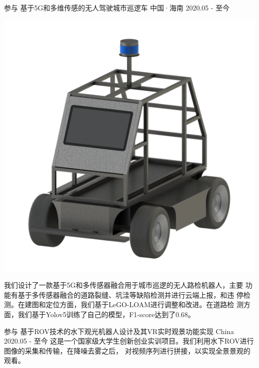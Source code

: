 \begin{cventries}
\cventry
{参与} %
{基于5G和多维传感的无人驾驶城市巡逻车} %
{中国·海南} %
{2020.05 - 至今} %
{
	\begin{minipage}[b]{0.25\linewidth}
		\includegraphics[height=8\baselineskip]{figure/car.png}
	\end{minipage}
	\hfill
	\begin{minipage}[b]{0.7\linewidth}
		我们设计了一款基于5G和多传感器融合用于城市巡逻的无人路检机器人，主要
		功能有基于多传感器融合的道路裂缝、坑洼等缺陷检测并进行云端上报，和违
		停检测。在建图和定位方面，我们基于LeGO-LOAM进行调整和改进。在道路检
		测方面，我们基于Yolov5训练了自己的模型，F1-score达到了0.68。
	\end{minipage}
}

\cventry
{参与} %
{基于ROV技术的水下观光机器人设计及其VR实时观景功能实现} %
{China} %
{2020.05 - 至今} %
{
	这是一个国家级大学生创新创业实训项目。我们利用水下ROV进行图像的采集和传输，在降噪去雾之后，
	对视频序列进行拼接，以实现全景景观的观看。
}



\end{cventries}
